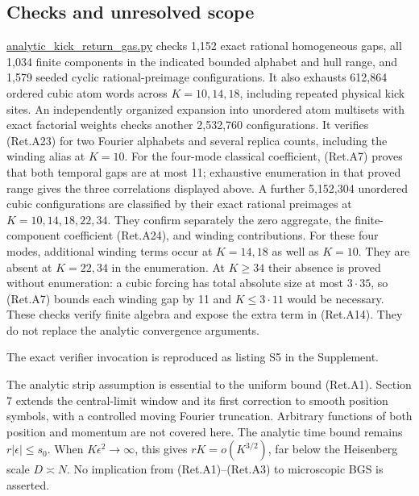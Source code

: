 \hypertarget{checks-and-unresolved-scope}{%
\subsection{Checks and unresolved scope}\label{checks-and-unresolved-scope}}

\href{https://github.com/ChurilovMaksim/BGS/blob/main/computations/verification/analytic_kick_return_gas.py}{analytic\_kick\_return\_gas.py}
checks 1,152 exact rational homogeneous gaps, all 1,034 finite components
in the indicated bounded alphabet and hull range, and 1,579 seeded
cyclic rational-preimage configurations.
It also exhausts 612,864 ordered cubic atom words across \(K=10,14,18\),
including repeated physical kick sites.
An independently organized expansion into unordered atom multisets
with exact factorial weights checks another 2,532,760 configurations.
It verifies (Ret.A23) for two Fourier alphabets and several replica counts,
including the winding alias at \(K=10\).
For the four-mode classical coefficient, (Ret.A7) proves that both
temporal gaps are at most 11; exhaustive enumeration in that proved
range gives the three correlations displayed above.
A further 5,152,304 unordered cubic configurations are classified
by their exact rational preimages at \(K=10,14,18,22,34\).
They confirm separately the zero aggregate, the finite-component
coefficient (Ret.A24), and winding contributions.
For these four modes, additional winding terms occur at \(K=14,18\)
as well as \(K=10\). They are absent at \(K=22,34\) in the enumeration.
At \(K\ge34\) their absence is proved without enumeration:
a cubic forcing has total absolute size at most \(3\cdot35\),
so (Ret.A7) bounds each winding gap by 11 and \(K\le3\cdot11\)
would be necessary.
These checks verify finite algebra and expose the extra term in (Ret.A14).
They do not replace the analytic convergence arguments.

The exact verifier invocation is reproduced as listing S5 in the Supplement.

The analytic strip assumption is essential to the uniform bound (Ret.A1).
Section 7 extends the central-limit window and its first correction to
smooth position symbols, with a controlled moving Fourier truncation.
Arbitrary functions of both position and momentum are not covered here.
The analytic time bound remains \(r|\epsilon|\le s_0\).
When \(K\epsilon^2\to\infty\), this gives \(rK=o(K^{3/2})\),
far below the Heisenberg scale \(D\asymp N\).
No implication from (Ret.A1)--(Ret.A3) to microscopic BGS is asserted.
